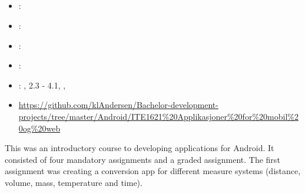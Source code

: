 \subsection[Android course]{}
\label{sec:android_course}
\begin{itemize} 
	\item {}: 
	\item {}: 
	\item {}: 
	\item {}: 
	\item {}: ,  2.3 - 4.1, , 
	\item {} \url{https://github.com/klAndersen/Bachelor-development-projects/tree/master/Android/ITE1621%20Applikasjoner%20for%20mobil%20og%20web}
\end{itemize} 
This was an introductory course to developing applications for Android. 
It consisted of four mandatory assignments and a graded assignment. 
\vspace{0.5em}\newline
The first assignment was creating a conversion app for different measure systems (distance, volume, mass, temperature and time).


